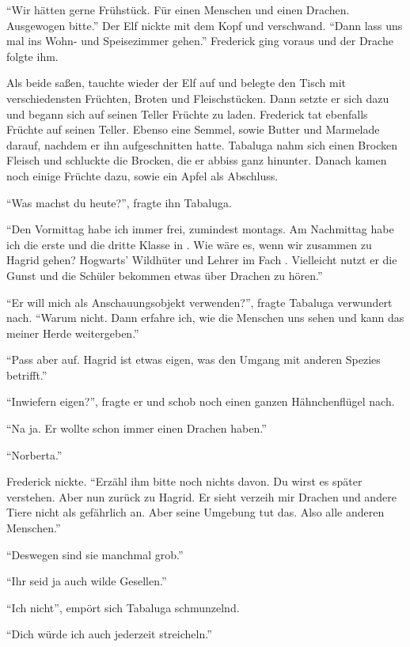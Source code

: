 \enquote{Wir hätten gerne Frühstück. Für einen Menschen und einen Drachen. Ausgewogen bitte.} Der Elf nickte mit dem Kopf und verschwand. \enquote{Dann lass uns mal ins Wohn- und Speisezimmer gehen.} Frederick ging voraus und der Drache folgte ihm.

Als beide saßen, tauchte wieder der Elf auf und belegte den Tisch mit verschiedensten Früchten, Broten und Fleischstücken. Dann setzte er sich dazu und begann sich auf seinen Teller Früchte zu laden. Frederick tat ebenfalls Früchte auf seinen Teller. Ebenso eine Semmel, sowie Butter und Marmelade darauf, nachdem er ihn aufgeschnitten hatte. Tabaluga nahm sich einen Brocken Fleisch und schluckte die Brocken, die er abbiss ganz hinunter. Danach kamen noch einige Früchte dazu, sowie ein Apfel als Abschluss.

\enquote{Was machst du heute?}, fragte ihn Tabaluga.

\enquote{Den Vormittag habe ich immer frei, zumindest montags. Am Nachmittag habe ich die erste und die dritte Klasse in \VgddK. Wie wäre es, wenn wir zusammen zu Hagrid gehen? Hogwarts’ Wildhüter und Lehrer im Fach . Vielleicht nutzt er die Gunst und die Schüler bekommen etwas über Drachen zu hören.}

\enquote{Er will mich als Anschauungsobjekt verwenden?}, fragte Tabaluga verwundert nach. \enquote{Warum nicht. Dann erfahre ich, wie die Menschen uns sehen und kann das meiner Herde weitergeben.}

\enquote{Pass aber auf. Hagrid ist etwas eigen, was den Umgang mit anderen Spezies betrifft.}

\enquote{Inwiefern eigen?}, fragte er und schob noch einen ganzen Hähnchenflügel nach.

\enquote{Na ja. Er wollte schon immer einen Drachen haben.}

\enquote{Norberta.}

Frederick nickte. \enquote{Erzähl ihm bitte noch nichts davon. Du wirst es später verstehen. Aber nun zurück zu Hagrid. Er sieht \gst verzeih mir \gst Drachen und andere Tiere nicht als gefährlich an. Aber seine Umgebung tut das. Also alle anderen Menschen.}

\enquote{Deswegen sind sie manchmal grob.}

\enquote{Ihr seid ja auch wilde Gesellen.}

\enquote{Ich nicht}, empört sich Tabaluga schmunzelnd.

\enquote{Dich würde ich auch jederzeit streicheln.}

